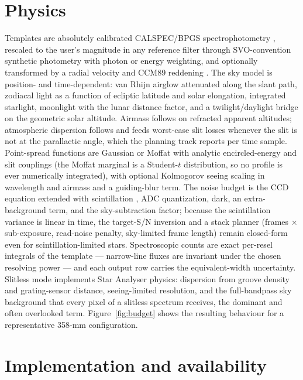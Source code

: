 \documentclass[RNAAS]{aastex631}
\begin{document}
\section{Physics}

Templates are absolutely calibrated CALSPEC/BPGS spectrophotometry
\citep{bohlin2014}, rescaled to the user's magnitude in any reference
filter through SVO-convention synthetic photometry \citep{rodrigo2020}
with photon or energy weighting, and optionally transformed by a radial
velocity and CCM89 reddening \citep{cardelli1989}. The sky model is
position- and time-dependent: van Rhijn airglow attenuated along the
slant path, zodiacal light as a function of ecliptic latitude and solar
elongation, integrated starlight, \citet{krisciunas1991} moonlight with
the lunar distance factor, and a twilight/daylight bridge on the
geometric solar altitude. Airmass follows \citet{pickering2002} on
refracted apparent altitudes; atmospheric dispersion follows
\citet{filippenko1982} and feeds worst-case slit losses whenever the slit
is not at the parallactic angle, which the planning track reports per
time sample. Point-spread functions are Gaussian or Moffat with analytic
encircled-energy and slit couplings (the Moffat marginal is a Student-$t$
distribution, so no profile is ever numerically integrated), with
optional Kolmogorov seeing scaling in wavelength and airmass and a
guiding-blur term. The noise budget is the CCD equation extended with
scintillation \citep{young1967,osborn2015}, ADC quantization, dark, an
extra-background term, and the \citet{merline1995} sky-subtraction
factor; because the scintillation variance is linear in time, the
target-S/N inversion and a stack planner (frames $\times$ sub-exposure,
read-noise penalty, sky-limited frame length) remain closed-form even
for scintillation-limited stars. Spectroscopic counts are exact per-resel
integrals of the template --- narrow-line fluxes are invariant under the
chosen resolving power --- and each output row carries the
\citet{cayrel1988} equivalent-width uncertainty. Slitless mode implements
Star Analyser physics: dispersion from groove density and grating-sensor
distance, seeing-limited resolution, and the full-bandpass sky background
that every pixel of a slitless spectrum receives, the dominant and often
overlooked term. Figure~\ref{fig:budget} shows the resulting behaviour
for a representative 358-mm configuration.

\section{Implementation and availability}
\end{document}
